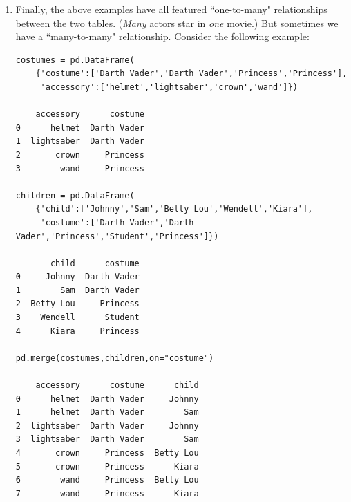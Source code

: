 \documentclass[12pt]{article}
\begin{document}
\begin{enumerate}
Then the resulting DataFrame would need to have two columns named
``\texttt{year}", with different meanings. Pandas solves this by renaming the
conflicting columns with a ``\texttt{\_x}" or ``\texttt{\_y}" suffix,
corresponding to the left/right tables in the join:

\footnotesize
\begin{Verbatim}[fontsize=small,samepage=true,frame=none]
                            actors_movies:
actor      year_x   film       salary (millions)   title      director   year_y
-------------------------------------------------------------------------------
Bullock    1964     Gravity    77                  Gravity    Cuaron     2013
DiCaprio   1974     Inception  59                  Inception  Nolan      2010
\end{Verbatim}
\normalsize

(which, of course, you can rename at will via ``\texttt{actors\_movies.columns}".)

\item Finally, the above examples have all featured ``one-to-many" relationships
between the two tables. (\textit{Many} actors star in \textit{one} movie.) But
sometimes we have a ``many-to-many" relationship. Consider the following
example:

\small
\begin{Verbatim}[fontsize=small,samepage=true,frame=none]
costumes = pd.DataFrame(
    {'costume':['Darth Vader','Darth Vader','Princess','Princess'],
     'accessory':['helmet','lightsaber','crown','wand']})

    accessory      costume
0      helmet  Darth Vader
1  lightsaber  Darth Vader
2       crown     Princess
3        wand     Princess

children = pd.DataFrame(
    {'child':['Johnny','Sam','Betty Lou','Wendell','Kiara'],
     'costume':['Darth Vader','Darth Vader','Princess','Student','Princess']})

       child      costume
0     Johnny  Darth Vader
1        Sam  Darth Vader
2  Betty Lou     Princess
3    Wendell      Student
4      Kiara     Princess

pd.merge(costumes,children,on="costume")

    accessory      costume      child
0      helmet  Darth Vader     Johnny
1      helmet  Darth Vader        Sam
2  lightsaber  Darth Vader     Johnny
3  lightsaber  Darth Vader        Sam
4       crown     Princess  Betty Lou
5       crown     Princess      Kiara
6        wand     Princess  Betty Lou
7        wand     Princess      Kiara
\end{Verbatim}
\normalsize


\end{enumerate}
\end{document}
